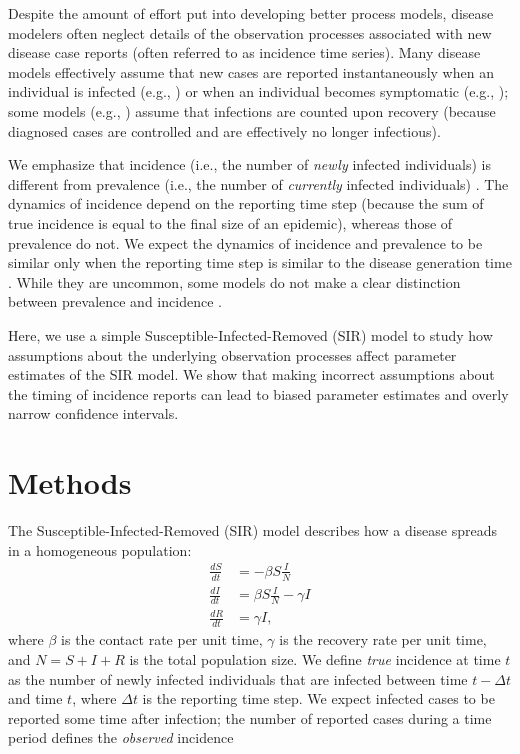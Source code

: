 \documentclass[12pt]{article}\usepackage[]{graphicx}\usepackage[]{color}
\begin{document}
Despite the amount of effort put into developing better process models, 
disease modelers often neglect details of the observation processes associated with
new disease case reports (often referred to as incidence time series).
Many disease models effectively assume that new cases are reported
instantaneously when an individual is infected (e.g., \cite{martinez2016differential, 
kennedy2018modeling, pons2018serotype}) or when an individual becomes symptomatic
(e.g., \cite{bhadra2011malaria, king2015avoidable}); 
some models (e.g., \cite{breto2009time, he2009plug, lin2016seasonality})
assume that infections are counted upon recovery (because diagnosed cases
are controlled and are effectively no longer infectious).

We emphasize that incidence (i.e., the number of \emph{newly} infected individuals) is different from prevalence (i.e., the number of \emph{currently} infected individuals) \citep{bjornstad2018epidemics}.
The dynamics of incidence depend on the reporting time step (because the sum of true incidence is equal to the final size of an epidemic), whereas those of prevalence do not.
We expect the dynamics of incidence and prevalence to be similar only when the reporting time step is similar to the disease generation time \citep{fine1982measles}.
While they are uncommon, some models do not make a clear distinction between prevalence and 
incidence \citep{capistran2009parameter, hooker2010parameterizing, yang2013stability, gonzalez2014fractional}.

Here, we use a simple Susceptible-Infected-Removed (SIR) model to study how
assumptions about the underlying observation processes affect parameter estimates
of the SIR model. We show that making incorrect assumptions about the timing of 
incidence reports can lead to biased parameter estimates and overly narrow 
confidence intervals.

\section{Methods}

The Susceptible-Infected-Removed (SIR) model describes how a disease spreads in a
homogeneous population:
\begin{equation}
\begin{aligned}
\frac{dS}{dt} &= - \beta S \frac{I}{N}\\
\frac{dI}{dt} &= \beta S \frac{I}{N} - \gamma I\\
\frac{dR}{dt} &= \gamma I,
\end{aligned}
\end{equation}
where $\beta$ is the contact rate per unit time, $\gamma$ is the recovery rate per unit time, 
and $N = S + I + R$ is the total population size. 
We define \emph{true} incidence at time $t$ as the number of newly infected
individuals that are infected between time $t- \Delta t$ and time $t$, where $\Delta t$ is
the reporting time step. We expect infected cases to be reported some time after infection;
the number of reported cases during a time period defines the \emph{observed} incidence
\end{document}
